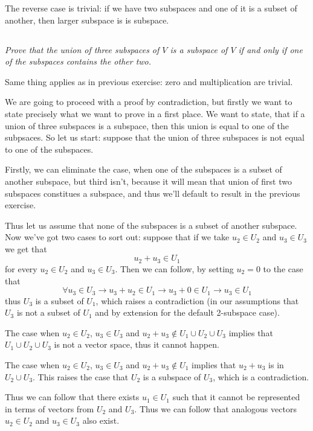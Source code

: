 \documentclass[11pt,oneside,titlepage]{book}
\begin{document}
The reverse case is trivial: if we have two subspaces and
one of it is a subset of another, then larger subspace is is subspace.

\subsection{}
\textit{Prove that the union of three subspaces of $V$ is a subspace of
  $V$ if and only if one of the subspaces contains the other two.}

Same thing applies as in previous exercise: zero and multiplication are
trivial.

We are going to proceed with a proof by contradiction, but firstly we want
to state precisely what we want to prove in a first place. We want to state,
that if a union of three subspaces is a subspace, then this union is equal to
one of the subpsaces. So let us start: suppose that the union of three subspaces is not equal to one of the subspaces.

Firstly, we can eliminate the case, when one of the subspaces is a
subset of another subspace, but third isn't, because it will mean that
union of first two subspaces constitues a subspace, and thus we'll default
to result in the previous exercise.

Thus let us assume that none of the subspaces is a subset of another subspace.
Now we've got two cases to sort out: suppose that if we take $u_2 \in U_2$
and $u_3 \in U_3$ we get that
$$u_2 + u_3 \in U_1$$
for every $u_2 \in U_2$ and $u_3 \in U_3$. Then we can follow, by setting
$u_2 = 0$ to the case that
$$\forall u_3 \in U_3 \to u_3 + u_2 \in U_1 \to u_3 + 0 \in U_1 \to
u_3 \in U_1$$
thus $U_3$ is a subset of $U_1$, which raises a contradiction (in our
assumptions that $U_3$ is not a subset of $U_1$  and by extension
for the default 2-subspace case).

The case when $u_2 \in U_2$, $u_3 \in U_3$ and $u_2 + u_3 \notin
U_1 \cup U_2 \cup U_3$ implies that $U_1 \cup U_2 \cup U_3$ is
not a vector space, thus it cannot happen.

The case when $u_2 \in U_2$, $u_3 \in U_3$ and $u_2 + u_3 \notin U_1$
implies that $u_2 + u_3$ is  in $U_2 \cup U_3$. This raises the case that
$U_2$ is a subspace of $U_3$, which is a contradiction.

Thus we can follow that there exists $u_1 \in U_1$ such that it
cannot be represented in terms of vectors from $U_2$ and $U_3$.
Thus we can follow that analogous  vectors   $u_2 \in U_2$ and $u_3 \in U_3$
also exist.
\end{document}

